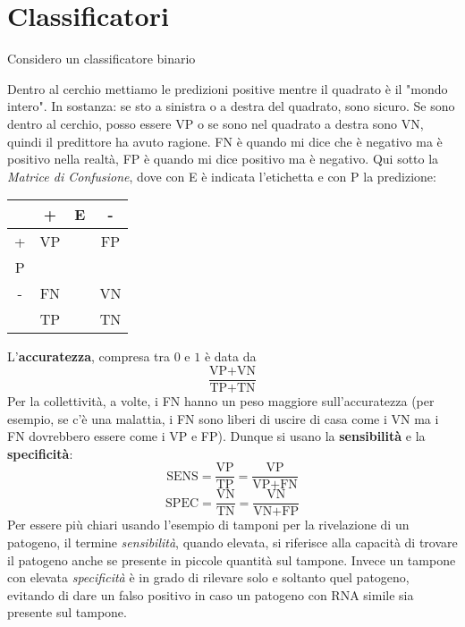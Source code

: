 \documentclass[11pt]{report}
\begin{document}
\section{Classificatori}
Considero un classificatore binario
\begin{center}
\end{center}
Dentro al cerchio mettiamo le predizioni positive mentre il quadrato è il "mondo intero". In sostanza: se sto a sinistra o a destra del quadrato, sono sicuro. Se sono dentro al cerchio, posso essere VP o se sono nel quadrato a destra sono VN, quindi il predittore ha avuto ragione. FN è quando mi dice che è negativo ma è positivo nella realtà, FP è quando mi dice positivo ma è negativo. Qui sotto la \textit{Matrice di Confusione}, dove con E è indicata l'etichetta e con P la predizione:
\begin{center}
    \begin{tabular}{ c| c c c }
    & + & E & - \\
    \hline
    + & VP & & FP \\ 
    P \\
    - & FN & & VN \\
    \hline
    & TP & & TN
    \end{tabular}
\end{center}
L'\textbf{accuratezza}, compresa tra $0$ e $1$ è data da
$$\frac{\text{VP} + \text{VN}}{\text{TP} + \text{TN}}$$
Per la collettività, a volte, i FN hanno un peso maggiore sull'accuratezza (per esempio, se c'è una malattia, i FN sono liberi di uscire di casa come i VN ma i FN dovrebbero essere come i VP e FP). Dunque si usano la \textbf{sensibilità} e la \textbf{specificità}:
$$\text{SENS} = \frac{\text{VP}}{\text{TP}} = \frac{\text{VP}}{\text{VP} + \text{FN}}$$
$$\text{SPEC} = \frac{\text{VN}}{\text{TN}} = \frac{\text{VN}}{\text{VN} + \text{FP}}$$
Per essere più chiari usando l'esempio di tamponi per la rivelazione di un patogeno, il termine \textit{sensibilità}, quando elevata, si riferisce alla capacità di trovare il patogeno anche se presente in piccole quantità sul tampone. Invece un tampone con elevata \textit{specificità} è in grado di rilevare solo e soltanto quel patogeno, evitando di dare un falso positivo in caso un patogeno con RNA simile sia presente sul tampone.
\end{document}
